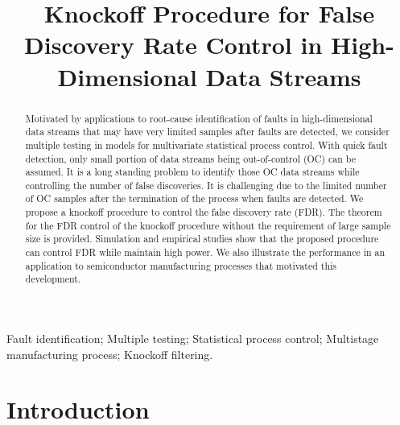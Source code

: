 \documentclass[]{interact}
\theoremstyle{plain}%
\theoremstyle{definition}
\theoremstyle{remark}
\begin{document}

\title{Knockoff Procedure for False Discovery Rate Control in High-Dimensional Data Streams}

\author{
}

\maketitle

\begin{abstract}
Motivated by applications to root-cause identification of faults in high-dimensional data streams that may have very limited samples after faults are detected, we consider multiple testing in models for multivariate statistical process control. With quick fault detection, only small portion of data streams being out-of-control (OC) can be assumed. It is a long standing problem to identify those OC data streams while controlling the number of false discoveries. It is challenging due to the limited number of OC samples after the termination of the process when faults are detected. We propose a knockoff procedure to control the false discovery rate (FDR). The theorem for the FDR control of the knockoff procedure without the requirement of large sample size is provided. Simulation and empirical studies show that the proposed procedure can control FDR while maintain high power. We also illustrate the performance in an application to semiconductor manufacturing processes that motivated this development.
 
\end{abstract}

\begin{keywords}
Fault identification; Multiple testing; Statistical process control; Multistage manufacturing process; Knockoff filtering.
\end{keywords}

\section{Introduction}\label{introduction}
\end{document}
